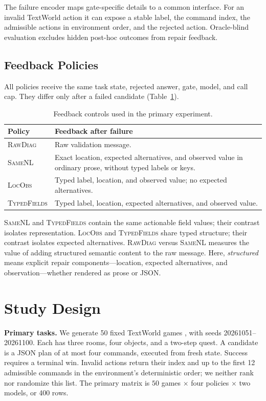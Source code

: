 \documentclass[sigconf,review,anonymous]{acmart}
\newcommand{\rawdiag}{\textsc{RawDiag}\xspace}
\newcommand{\samenl}{\textsc{SameNL}\xspace}
\newcommand{\locobs}{\textsc{LocObs}\xspace}
\newcommand{\typedfields}{\textsc{TypedFields}\xspace}
\begin{document}
The failure encoder maps gate-specific details to a common interface. For an
invalid TextWorld action it can expose a stable label, the command index, the
admissible actions in environment order, and the rejected action. Oracle-blind
evaluation excludes hidden post-hoc outcomes from repair feedback.

\subsection{Feedback Policies}

All policies receive the same task state, rejected answer, gate, model, and
call cap. They differ only after a failed candidate (Table~\ref{tab:policies}).

\begin{table}[t]
\caption{Feedback controls used in the primary experiment.}
\label{tab:policies}
\small
\begin{tabular}{@{}p{}p{}@{}}
\toprule
Policy & Feedback after failure \\
\midrule
\rawdiag & Raw validation message. \\
\samenl & Exact location, expected alternatives, and observed value in ordinary
prose, without typed labels or keys. \\
\locobs & Typed label, location, and observed value; no expected alternatives. \\
\typedfields & Typed label, location, expected alternatives, and observed value. \\
\bottomrule
\end{tabular}
\end{table}

\samenl and \typedfields contain the same actionable field values; their
contrast isolates representation. \locobs and \typedfields share typed
structure; their contrast isolates expected alternatives. \rawdiag versus
\samenl measures the value of adding structured semantic content to the raw
message. Here, \emph{structured} means explicit repair components---location,
expected alternatives, and observation---whether rendered as prose or JSON.

\section{Study Design}

\textbf{Primary tasks.} We generate 50 fixed TextWorld games
\cite{cote2018textworld}, with seeds 20261051--20261100. Each has three rooms,
four objects, and a two-step quest. A candidate is a JSON plan of at most four
commands, executed from fresh state. Success requires a terminal win. Invalid
actions return their index and up to the first 12 admissible commands in the
environment's deterministic order; we neither rank nor randomize this list.
The primary matrix is $50$ games $\times$ four policies $\times$ two models,
or 400 rows.
\end{document}
